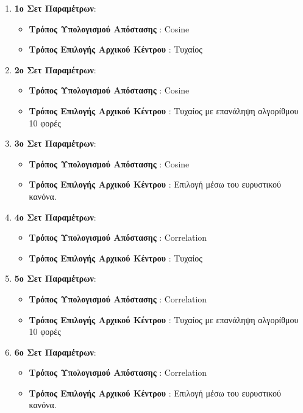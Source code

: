 \begin{enumerate}
    \item \textbf{1ο Σετ Παραμέτρων}: 
    \begin{itemize}
        \item \textbf{Τρόπος Υπολογισμού Απόστασης} : Cosine
        \item \textbf{Τρόπος Επιλογής Αρχικού Κέντρου} : Τυχαίος
    \end{itemize}
    \item  \textbf{2ο Σετ Παραμέτρων}:
    \begin{itemize}
        \item \textbf{Τρόπος Υπολογισμού Απόστασης} : Cosine
        \item \textbf{Τρόπος Επιλογής Αρχικού Κέντρου} : Τυχαίος με επανάληψη αλγορίθμου 10 φορές
    \end{itemize}
    \item  \textbf{3ο Σετ Παραμέτρων}:
        \begin{itemize}
            \item \textbf{Τρόπος Υπολογισμού Απόστασης} : Cosine
            \item \textbf{Τρόπος Επιλογής Αρχικού Κέντρου} : Επιλογή μέσω του ευρυστικού κανόνα.
        \end{itemize}
    \item  \textbf{4ο Σετ Παραμέτρων}:
        \begin{itemize}
            \item \textbf{Τρόπος Υπολογισμού Απόστασης} : Correlation
            \item \textbf{Τρόπος Επιλογής Αρχικού Κέντρου} : Τυχαίος
        \end{itemize}
    \item  \textbf{5ο Σετ Παραμέτρων}:
        \begin{itemize}
            \item \textbf{Τρόπος Υπολογισμού Απόστασης} : Correlation
            \item \textbf{Τρόπος Επιλογής Αρχικού Κέντρου} : Τυχαίος με επανάληψη αλγορίθμου 10 φορές
        \end{itemize}
    \item  \textbf{6ο Σετ Παραμέτρων}:
        \begin{itemize}
            \item \textbf{Τρόπος Υπολογισμού Απόστασης} : Correlation
            \item \textbf{Τρόπος Επιλογής Αρχικού Κέντρου} :  Επιλογή μέσω του ευρυστικού κανόνα.
        \end{itemize}
\end{enumerate}

